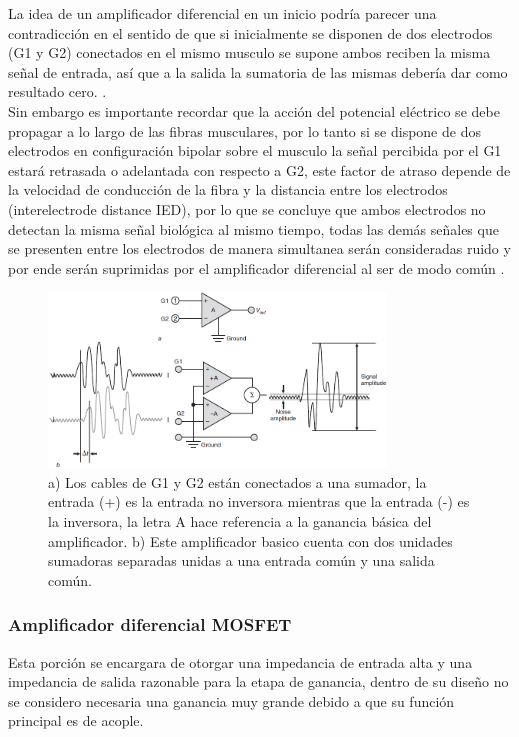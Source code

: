 La idea de un amplificador diferencial en un inicio podría parecer una contradicción en el sentido de que si inicialmente se disponen de dos electrodos (G1 y G2) conectados en el mismo musculo se supone ambos reciben la misma señal de entrada, así que a la salida la sumatoria de las mismas debería dar como resultado cero. \cite{EMG_instrumentation}. \\
Sin embargo es importante recordar que la acción del potencial eléctrico se debe propagar a lo largo de las fibras musculares, por lo tanto si se dispone de dos electrodos en configuración bipolar sobre el musculo la señal percibida por el G1 estará retrasada o adelantada con respecto a G2, este factor de atraso depende de la velocidad de conducción de la fibra y la distancia entre los electrodos (interelectrode distance IED), por lo que se concluye que ambos electrodos no detectan la misma señal biológica al mismo tiempo, todas las demás señales que se presenten entre los electrodos de manera simultanea serán consideradas ruido y por ende serán suprimidas por el amplificador diferencial al ser de modo común \cite{EMG_instrumentation}.

\begin{figure}[H]
  \centering
  \includegraphics[width=0.8\textwidth]{Capitulo_2/signalinput.png}
  \caption{a) Los cables de G1 y G2 están conectados a una sumador, la entrada (+) es la entrada no inversora mientras que la entrada (-) es la inversora, la letra A hace referencia a la ganancia básica del amplificador. b) Este amplificador basico cuenta con dos unidades sumadoras separadas unidas a una entrada común y una salida común.}
  \label{signalinput} 
\end{figure}
\subsubsection{Amplificador diferencial MOSFET}
Esta porción se encargara de otorgar una impedancia de entrada alta y una impedancia de salida razonable para la etapa de ganancia, dentro de su diseño no se considero necesaria una ganancia muy grande debido a que su función principal es de acople. \\

